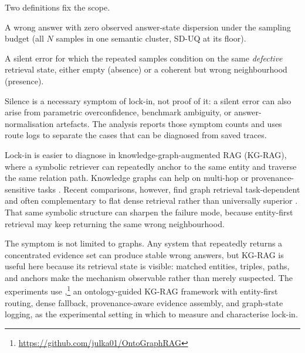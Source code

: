 Two definitions fix the scope.
\begin{definition}
A wrong answer with zero observed answer-state dispersion under the sampling
budget (all $N$ samples in one semantic cluster, SD-UQ at its floor).
\end{definition}
\begin{definition}
A silent error for which the repeated samples condition on the same
\emph{defective} retrieval state, either empty (absence) or a coherent but
wrong neighbourhood (presence).
\end{definition}
Silence is a necessary symptom of lock-in, not proof of it: a silent
error can also arise from parametric overconfidence, benchmark ambiguity, or
answer-normalisation artefacts.
The analysis reports those symptom counts and uses route logs to separate the
cases that can be diagnosed from saved traces.



Lock-in is easier to diagnose in knowledge-graph-augmented RAG (KG-RAG),
where a symbolic retriever can repeatedly anchor to the same entity and
traverse the same relation path.
Knowledge graphs can help on multi-hop or provenance-sensitive tasks
\citep{edge2024graphrag,gutierrez2024hipporag,hu2025grag,shen2025gear,zhu2025kg2rag,wu2025medgraphrag}.
Recent comparisons, however, find graph retrieval task-dependent and often
complementary to flat dense retrieval rather than universally superior
\citep{zhang2025ragvsgraphrag,xiang2025whengraphs,
chen2025comparingraggraphrag,peng2024graphragsurvey}.
That same symbolic structure can sharpen the failure mode, because entity-first
retrieval may keep returning the same wrong neighbourhood.

The symptom is not limited to graphs. Any system that repeatedly returns a
concentrated evidence set can produce stable wrong answers, but KG-RAG is
useful here because its retrieval state is visible: matched entities,
triples, paths, and anchors make the mechanism observable rather than merely
suspected.
The experiments use \system{},\footnote{\url{https://github.com/julka01/OntoGraphRAG}}
an ontology-guided KG-RAG framework with
entity-first routing, dense fallback, provenance-aware evidence assembly, and
graph-state logging, as the experimental setting in which to measure and
characterise lock-in.

